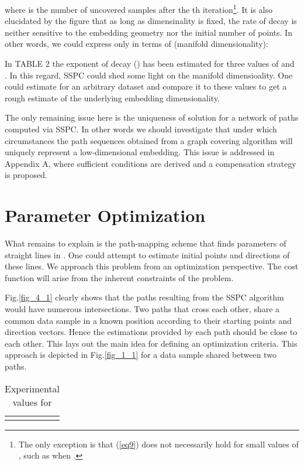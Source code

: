 \documentclass[10pt,journal,cspaper,compsoc]{IEEEtran}
\let\MYoriglatexcaption\caption
\renewcommand{\caption}[2][\relax]{\MYoriglatexcaption[#2]{#2}}
\begin{document}
where  is the number of uncovered samples after the th iteration\footnote{The only exception is that (\ref{eq9}) does not necessarily hold for small values of , such as when .}. It is also elucidated by the figure that as long as dimensinality is fixed, the rate of decay is neither sensitive to the embedding geometry nor the initial number of points. In other words, we could express  only in terms of  (manifold dimensionality):


In TABLE 2 the exponent of decay () has been estimated for three values of  and . In this regard, SSPC could shed some light on the manifold dimensioality. One could estimate  for an arbitrary dataset and compare it to these values to get a rough estimate of the underlying embedding dimensionality.

The only remaining issue here is the uniqueness of solution for a network of paths computed via SSPC. In other words we should investigate that under which circumstances the path sequences obtained from a graph covering algorithm will uniquely represent a low-dimensional embedding. This issue is addressed in Appendix A, where sufficient conditions are derived and a compensation strategy is proposed.














\section{Parameter Optimization}
What remains to explain is the path-mapping scheme that finds parameters of straight lines in  . One could attempt to estimate initial points and directions of these lines. We approach this problem from an optimization perspective. The cost function will arise from the inherent constraints of the problem. 

Fig.\ref{fig_4_1} clearly shows that the paths resulting from the SSPC algorithm would have numerous intersections. Two paths that cross each other, share a common data sample in a known position according to their starting points and direction vectors. Hence the estimations provided by each path should be close to each other. This lays out the main idea for defining an optimization criteria. This approach is depicted in Fig.\ref{fig_1_1} for a data sample shared between two paths.

\begin{table}[t]
\label{table2}
\caption{Experimental values for }
\begin{center}
\begin{tabular}{| c | c | c | c |}
\hline
 &  &  & \\ \hline
 &  &  & \\ \hline
\end{tabular}
\end{center}
\end{table}
\end{document}

